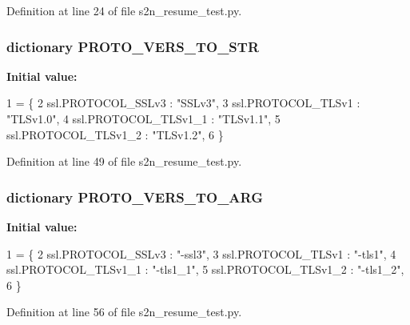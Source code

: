 Definition at line 24 of file s2n\+\_\+resume\+\_\+test.\+py.

\subsubsection[{\texorpdfstring{P\+R\+O\+T\+O\+\_\+\+V\+E\+R\+S\+\_\+\+T\+O\+\_\+\+S\+TR}{PROTO_VERS_TO_STR}}]{\setlength{\rightskip}{0pt plus 5cm}dictionary P\+R\+O\+T\+O\+\_\+\+V\+E\+R\+S\+\_\+\+T\+O\+\_\+\+S\+TR}\hypertarget{namespaces2n__resume__test_a58e49fbf9e2d2275dc26b83ca33c2be5}{}\label{namespaces2n__resume__test_a58e49fbf9e2d2275dc26b83ca33c2be5}
{\bfseries Initial value\+:}
\begin{DoxyCode}
1 = \{
2     ssl.PROTOCOL\_SSLv3 : \textcolor{stringliteral}{"SSLv3"},
3     ssl.PROTOCOL\_TLSv1 : \textcolor{stringliteral}{"TLSv1.0"},
4     ssl.PROTOCOL\_TLSv1\_1 : \textcolor{stringliteral}{"TLSv1.1"},
5     ssl.PROTOCOL\_TLSv1\_2 : \textcolor{stringliteral}{"TLSv1.2"},
6 \}
\end{DoxyCode}


Definition at line 49 of file s2n\+\_\+resume\+\_\+test.\+py.

\subsubsection[{\texorpdfstring{P\+R\+O\+T\+O\+\_\+\+V\+E\+R\+S\+\_\+\+T\+O\+\_\+\+A\+RG}{PROTO_VERS_TO_ARG}}]{\setlength{\rightskip}{0pt plus 5cm}dictionary P\+R\+O\+T\+O\+\_\+\+V\+E\+R\+S\+\_\+\+T\+O\+\_\+\+A\+RG}\hypertarget{namespaces2n__resume__test_a9d72f369529645dbdb50ee3e23136d3d}{}\label{namespaces2n__resume__test_a9d72f369529645dbdb50ee3e23136d3d}
{\bfseries Initial value\+:}
\begin{DoxyCode}
1 = \{
2     ssl.PROTOCOL\_SSLv3 : \textcolor{stringliteral}{"-ssl3"},
3     ssl.PROTOCOL\_TLSv1 : \textcolor{stringliteral}{"-tls1"},
4     ssl.PROTOCOL\_TLSv1\_1 : \textcolor{stringliteral}{"-tls1\_1"},
5     ssl.PROTOCOL\_TLSv1\_2 : \textcolor{stringliteral}{"-tls1\_2"},
6 \}
\end{DoxyCode}


Definition at line 56 of file s2n\+\_\+resume\+\_\+test.\+py.

